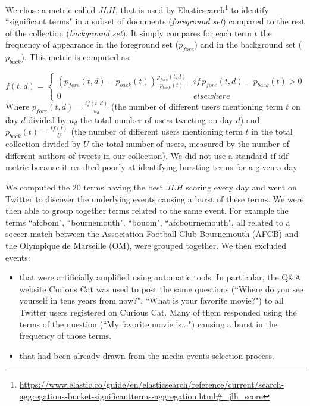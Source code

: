 We chose a metric called $JLH$, that is used by Elasticsearch\footnote{\url{https://www.elastic.co/guide/en/elasticsearch/reference/current/search-aggregations-bucket-significantterms-aggregation.html\#_jlh_score}}  to identify ``significant terms" in a subset of documents (\textit{foreground set}) compared to the rest of the collection (\textit{background set}). It simply compares for each term $t$ the frequency of appearance in the foreground set ($p_{fore}$) and in the background set ($p_{back}$). This metric is computed as:

$$
f(t,d) = \left\{
	\begin{array}{ll}
		(p_{fore}(t,d) - p_{back}(t))\frac{p_{fore}(t,d)}{p_{back}(t)} & if\, p_{fore}(t,d) - p_{back}(t) > 0\\
		0 & elsewhere
	\end{array}
\right.
$$
Where $p_{fore}(t,d) = \frac{tf(t,d)}{u_d}$  (the number of different users mentioning term $t$ on day $d$ divided by $u_d$ the total number of users tweeting on day $d$) and $p_{back}(t)  = \frac{tf(t)}{U}$ (the number of different users mentioning term $t$ in the total collection divided by $U$  the total number of users, measured by the number of different authors of tweets in our collection). We did not use a standard $\mbox{tf-idf}$ metric because it resulted poorly at identifying bursting terms for a given a day.


We computed the 20 terms having the best $JLH$ scoring every day and went on Twitter to discover the underlying events causing a burst of these terms. We were then able to group together terms related to the same event. For example the terms ``afcbom", ``bournemouth", ``bouom", ``afcbournemouth", all related to a soccer match between the Association Football Club Bournemouth (AFCB) and the Olympique de Marseille (OM), were grouped together. We then excluded events:
\begin{itemize}
\item that were artificially amplified using automatic tools. In particular, the Q\&A website Curious Cat was used to post the same questions (``Where do you see yourself in tens years from now?", ``What is your favorite movie?") to all Twitter users registered on Curious Cat. Many of them responded using the terms of the question (``My favorite movie is...") causing a burst in the frequency of those terms.
\item that had been already drawn from the media events selection process.
\end{itemize}

